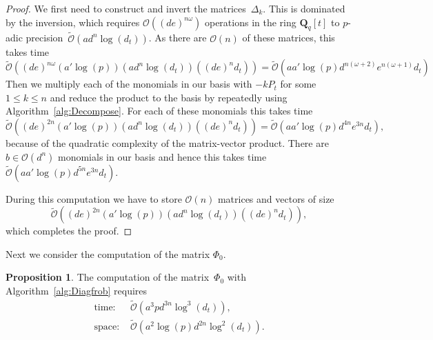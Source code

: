 \documentclass[a4paper,11pt]{article}
\numberwithin{equation}{section}
\newcommand{\QQ}{\mathbf{Q}} %
\providecommand{\BigOh}{\mathcal{O}}          %
\providecommand{\SoftOh}{\tilde{\mathcal{O}}} %
\theoremstyle{definition}
\newtheorem{prop}[thm]{Proposition}
\begin{document}
\begin{proof}
We first need to construct and invert the matrices~$\Delta_k$.  This 
is dominated by the inversion, which requires $\BigOh((de)^{n \omega})$ 
operations in the ring $\QQ_q[t]$ to $p$-adic 
precision~$\SoftOh(a d^n \log(d_t))$. As there are $\BigOh(n)$ of 
these matrices, this takes time 
\[
\SoftOh((de)^{n \omega} (a' \log(p)) (a d^n \log(d_t)) ((de)^n d_t)) = 
    \SoftOh(a a' \log(p) d^{n(\omega+2)} e^{n(\omega+1)} d_t)
\]
Then we multiply each of the monomials in our basis with $-k P_t$ 
for some $1 \leq k \leq n$ and reduce the product to the basis by 
repeatedly using Algorithm~\ref{alg:Decompose}.  For each of these 
monomials this takes time 
\[
\SoftOh((de)^{2n} (a' \log(p)) (a d^n \log(d_t)) ((de)^n d_t)) = 
    \SoftOh(a a' \log(p) d^{4n}e^{3n} d_t),
\]
because of the quadratic complexity of the matrix-vector product.  
There are $b \in \BigOh(d^n)$ monomials in our basis and hence this 
takes time $\SoftOh(a a' \log(p) d^{5n}e^{3n} d_t)$.

During this computation we have to store $\BigOh(n)$ matrices 
and vectors of size 
\[
\SoftOh((de)^{2n} (a' \log(p)) (a d^n \log(d_t)) ((de)^n d_t)),
\] 
which completes the proof.
\end{proof}

Next we consider the computation of the matrix $\Phi_0$.

\begin{prop} \label{prop:complexityPhi0}
The computation of the matrix~$\Phi_0$ with Algorithm~\ref{alg:Diagfrob} requires
\begin{align*}
\mbox{time: }  &\SoftOh(a^3 p d^{3n} \log^3(d_t)), \\
\mbox{space: } &\SoftOh(a^2 \log(p) d^{2n} \log^2(d_t)).
\end{align*}
\end{prop}
\end{document}
